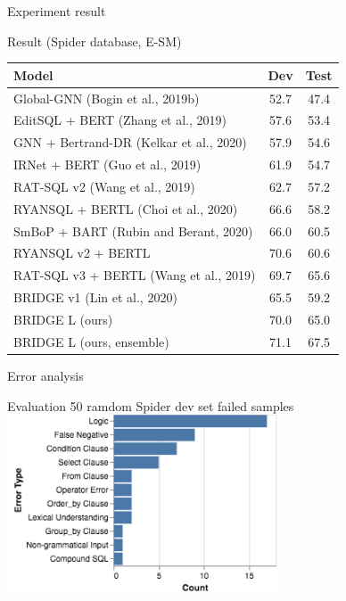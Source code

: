 \documentclass{beamer}
\begin{document}
\begin{frame}[t]{Experiment result}\vspace{10pt}
\begin{block}{Result (Spider database, E-SM)}
\begin{tabular}{ |l|c|c| }
\hline
 Model & Dev & Test \\
\hline
 Global-GNN (Bogin et al., 2019b) & 52.7 & 47.4 \\
 EditSQL + BERT (Zhang et al., 2019) & 57.6 & 53.4 \\
 GNN + Bertrand-DR (Kelkar et al., 2020) & 57.9 & 54.6 \\
 IRNet + BERT (Guo et al., 2019) & 61.9 & 54.7 \\
 RAT-SQL v2 (Wang et al., 2019) & 62.7 & 57.2 \\
 RYANSQL + BERTL (Choi et al., 2020) & 66.6 & 58.2 \\
 SmBoP + BART (Rubin and Berant, 2020) & 66.0 & 60.5 \\
 RYANSQL v2 + BERTL & 70.6 & 60.6 \\
 RAT-SQL v3 + BERTL (Wang et al., 2019) & 69.7 & 65.6 \\
 BRIDGE v1 (Lin et al., 2020) & 65.5 & 59.2 \\
 BRIDGE L (ours) & 70.0 & 65.0 \\
 BRIDGE L (ours, ensemble) & 71.1 & 67.5 \\
\hline
\end{tabular}
\end{block}
\end{frame}

\begin{frame}[t]{Error analysis}\vspace{10pt}
\begin{block}{Evaluation}
50 ramdom Spider dev set failed samples
\includegraphics{error}
\end{block}
\end{frame}
\end{document}
